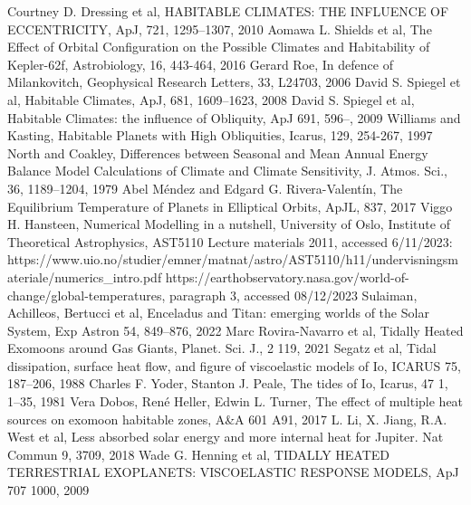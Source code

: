 \documentclass[12pt, onecolumn]{revtex4-2}    %
\begin{document}
\begin{thebibliography}{MastersZachMcBrearty.bib}
     Courtney D. Dressing et al, HABITABLE CLIMATES: THE INFLUENCE OF ECCENTRICITY, ApJ, 721, 1295--1307, 2010
     Aomawa L. Shields et al, The Effect of Orbital Configuration on the Possible Climates and Habitability of Kepler-62f, Astrobiology, 16, 443-464, 2016
     Gerard Roe, In defence of Milankovitch, Geophysical Research Letters, 33, L24703, 2006
     David S. Spiegel et al, Habitable Climates, ApJ, 681, 1609--1623, 2008
     David S. Spiegel et al, Habitable Climates: the influence of Obliquity, ApJ 691, 596--, 2009
     Williams and Kasting, Habitable Planets with High Obliquities, Icarus, 129, 254-267, 1997
     North and Coakley, Differences between Seasonal and Mean Annual Energy Balance Model Calculations of Climate and Climate Sensitivity, J. Atmos. Sci., 36, 1189--1204, 1979
     Abel Méndez and Edgard G. Rivera-Valentín, The Equilibrium Temperature of Planets in Elliptical Orbits, ApJL, 837, 2017
     Viggo H. Hansteen, Numerical Modelling in a nutshell, University of Oslo, Institute of Theoretical Astrophysics, AST5110 Lecture materials 2011, accessed 6/11/2023: https://www.uio.no/studier/emner/matnat/astro/AST5110/h11/undervisningsmateriale/numerics\_intro.pdf
     https://earthobservatory.nasa.gov/world-of-change/global-temperatures, paragraph 3, accessed 08/12/2023
     Sulaiman, Achilleos, Bertucci et al, Enceladus and Titan: emerging worlds of the Solar System, Exp Astron 54, 849--876, 2022
     Marc Rovira-Navarro et al, Tidally Heated Exomoons around Gas Giants, Planet. Sci. J., 2 119, 2021
     Segatz et al, Tidal dissipation, surface heat flow, and figure of viscoelastic models of Io, ICARUS 75, 187--206, 1988
     Charles F. Yoder, Stanton J. Peale, The tides of Io, Icarus, 47 1, 1--35, 1981
     Vera Dobos, René Heller, Edwin L. Turner, The effect of multiple heat sources on exomoon habitable zones, A\&A 601 A91, 2017
     L. Li, X. Jiang, R.A. West et al, Less absorbed solar energy and more internal heat for Jupiter. Nat Commun 9, 3709, 2018
     Wade G. Henning et al, TIDALLY HEATED TERRESTRIAL EXOPLANETS: VISCOELASTIC RESPONSE MODELS, ApJ 707 1000, 2009
\end{thebibliography}
\end{document}
